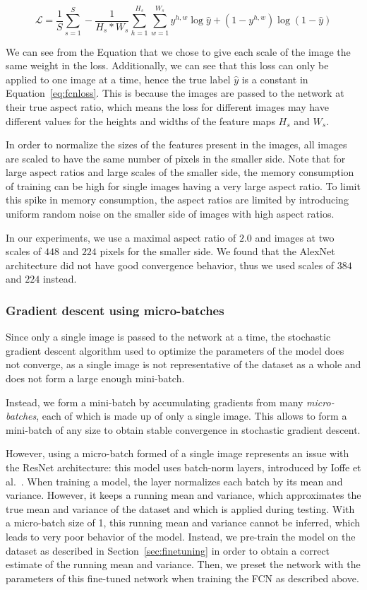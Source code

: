 \begin{equation}\label{eq:fcnloss}
\mathcal{L} = \frac{1}{S} \sum_{s=1}^S - \frac{1}{H_s*W_s}
\sum_{h=1}^{H_s} \sum_{w=1}^{W_s} y^{h,w} \log \hat{y} +
(1-y^{h,w}) \log (1-\hat{y})
\end{equation}

We can see from the Equation that we chose to give each scale of the image
the same weight in the loss. Additionally, we can see that this loss can
only be applied to one image at a time, hence the true label $\hat{y}$ is
a constant in Equation~\ref{eq:fcnloss}.
This is because the images are passed to the network at their true
aspect ratio, which means the loss for different images may have different
values for the heights and widths of the feature maps $H_s$ and $W_s$.

In order to normalize the sizes of the features present in the images,
all images are scaled to have the same
number of pixels in the smaller side. Note that for large aspect
ratios and large scales of the smaller side,
the memory consumption of training can be high for single images
having a very large aspect ratio. To limit this spike in memory
consumption, the aspect ratios are limited by introducing uniform
random noise on the smaller side of images with high aspect ratios.

In our experiments, we use a maximal aspect ratio of $2.0$ and images
at two scales of $448$ and $224$ pixels for the smaller side. We found
that the AlexNet architecture did not have good convergence behavior,
thus we used scales of $384$ and $224$ instead.

\subsubsection{Gradient descent using micro-batches}
Since only a single image is passed to the network at a time, the
stochastic gradient descent algorithm used to optimize the parameters
of the model does not converge, as a single image is not representative
of the dataset as a whole and does not form a large enough mini-batch.

Instead, we form a mini-batch by accumulating gradients from many
\emph{micro-batches}, each of which is made up of only a single image.
This allows to form a mini-batch of any size to obtain stable convergence
in stochastic gradient descent.

However, using a micro-batch formed of a single image represents an issue
with the ResNet architecture: this model uses batch-norm layers, introduced
by Ioffe et al.~\cite{ioffe_batch_2015}. When training a model, the layer
normalizes each batch by its mean and variance. However, it keeps a running
mean and variance, which approximates the true mean and variance of the
dataset and which is applied during testing. With a micro-batch size
of 1, this running mean and variance cannot be inferred, which leads to
very poor behavior of the model. Instead, we pre-train the model on the
dataset as described in Section~\ref{sec:finetuning} in order to obtain
a correct estimate of the running mean and variance. Then, we preset the
network with the parameters of this fine-tuned network when training the
FCN as described above.

